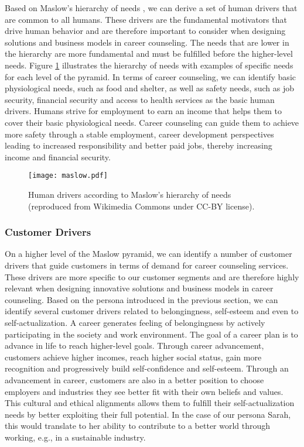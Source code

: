 Based on Maslow's hierarchy of needs \cite{maslowTheoryHumanMotivation1943}, we can derive a set of human drivers that
are common to all humans. These drivers are the fundamental motivators that drive human behavior and are therefore
important to consider when designing solutions and business models in career counseling. The needs that are lower in
the hierarchy are more fundamental and must be fulfilled before the higher-level needs.
Figure \ref{fig:maslow} illustrates the hierarchy of needs with examples of specific needs for each level of the pyramid.
In terms of career counseling, we can identify basic physiological needs, such as food and shelter, as well as safety needs,
such as job security, financial security and access to health services as the basic human drivers. Humans strive for employment
to earn an income that helps them to cover their basic physiological needs. Career counseling can guide them to achieve more
safety through a stable employment, career development perspectives leading to increased responsibility and better paid jobs,
thereby increasing income and financial security.

\begin{figure}[h!]
    \centering
    \caption{Human drivers according to Maslow's hierarchy of needs \cite{maslowTheoryHumanMotivation1943} (reproduced
    from Wikimedia Commons under CC-BY license).}
    \label{fig:maslow}
    \texttt{[image: maslow.pdf]}
\end{figure}

\subsubsection{Customer Drivers}

On a higher level of the Maslow pyramid, we can identify a number of customer drivers that guide customers in terms of
demand for career counseling services. These drivers are more specific to our customer segments and are therefore 
highly relevant when designing innovative solutions and business models in career counseling. Based on the persona 
introduced in the previous section, we can identify several customer drivers related to belongingness, self-esteem
and even to self-actualization. A career generates feeling of belongingness by actively participating in the society
and work environment. The goal of a career plan is to advance in life to reach higher-level goals. Through
career advancement, customers achieve higher incomes, reach higher social status, gain more recognition and progressively
build self-confidence and self-esteem. Through an advancement in career, customers are also in a better position to
choose employers and industries they see better fit with their own beliefs and values. This cultural and ethical
alignments allows them to fulfill their self-actualization needs by better exploiting their full potential. In
the case of our persona Sarah, this would translate to her ability to contribute to a better world through
working, e.g., in a sustainable industry.


